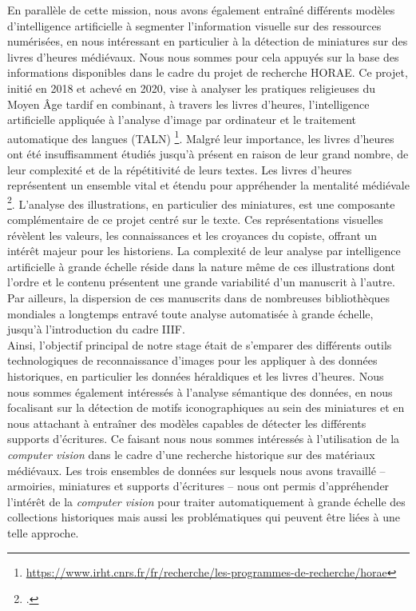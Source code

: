 \documentclass[12pt,twoside]{book}
\begin{document}
\newpage
En parallèle de cette mission, nous avons également entraîné différents modèles d'intelligence artificielle à segmenter l'information visuelle sur des ressources numérisées, en nous intéressant en particulier à la détection de miniatures sur des livres d'heures médiévaux. Nous nous sommes pour cela appuyés sur la base des informations disponibles dans le cadre du projet de recherche HORAE. Ce projet, initié en 2018 et achevé en 2020, vise à analyser les pratiques religieuses du Moyen Âge tardif en combinant, à travers les livres d’heures, l’intelligence artificielle appliquée à l’analyse d’image par ordinateur et le traitement automatique des langues (TALN) \footnote{\url{https://www.irht.cnrs.fr/fr/recherche/les-programmes-de-recherche/horae}}. Malgré leur importance, les livres d'heures ont été insuffisamment étudiés jusqu'à présent en raison de leur grand nombre, de leur complexité et de la répétitivité de leurs textes. Les livres d'heures représentent un ensemble vital et étendu pour appréhender la mentalité médiévale \footcite{stutzmann_texte_2021}. L'analyse des illustrations, en particulier des miniatures, est une composante complémentaire de ce projet centré sur le texte. Ces représentations visuelles révèlent les valeurs, les connaissances et les croyances du copiste, offrant un intérêt majeur pour les historiens. La complexité de leur analyse par intelligence artificielle à grande échelle réside dans la nature même de ces illustrations dont l’ordre et le contenu présentent une grande variabilité d’un manuscrit à l’autre. Par ailleurs, la dispersion de ces manuscrits dans de nombreuses bibliothèques mondiales a longtemps entravé toute analyse automatisée à grande échelle, jusqu'à l'introduction du cadre IIIF. \\

 Ainsi, l’objectif principal de notre stage était de s’emparer des différents outils technologiques de reconnaissance d’images pour les appliquer à des données historiques, en particulier les données héraldiques et les livres d’heures. Nous nous sommes également intéressés à l'analyse sémantique des données, en nous focalisant sur la détection de motifs iconographiques au sein des miniatures et en nous attachant à entraîner des modèles capables de détecter les différents supports d’écritures. Ce faisant nous nous sommes intéressés à l’utilisation de la \textit{computer vision} dans le cadre d’une recherche historique sur des matériaux médiévaux. Les trois ensembles de données sur lesquels nous avons travaillé – armoiries, miniatures et supports d’écritures – nous ont permis d’appréhender l’intérêt de la \textit{computer vision} pour traiter automatiquement à grande échelle des collections historiques mais aussi les problématiques qui peuvent être liées à une telle approche.
 
\end{document}
